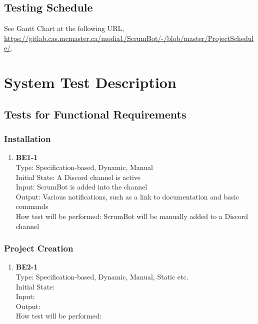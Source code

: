 \documentclass[12pt, titlepage]{article}
\begin{document}
\subsection{Testing Schedule}
See Gantt Chart at the following URL, \url{https://gitlab.cas.mcmaster.ca/modia1/ScrumBot/-/blob/master/ProjectSchedule/}.

\section{System Test Description}
\subsection{Tests for Functional Requirements}

\subsubsection{Installation}

\begin{enumerate}
    \item{\textbf{BE1-1}}\\
    Type: Specification-based, Dynamic, Manual\\
    Initial State: A Discord channel is active\\
    Input: ScrumBot is added into the channel\\
    Output: Various notifications, such as a link to documentation and basic commands\\
    How test will be performed: ScrumBot will be manually added to a Discord channel\\
\end{enumerate}

\subsubsection{Project Creation}

\begin{enumerate}
    \item{\textbf{BE2-1}}\\
    Type: Specification-based, Dynamic, Manual, Static etc.\\
    Initial State: \\
    Input: \\
    Output: \\
    How test will be performed: \\
\end{enumerate}
\end{document}

